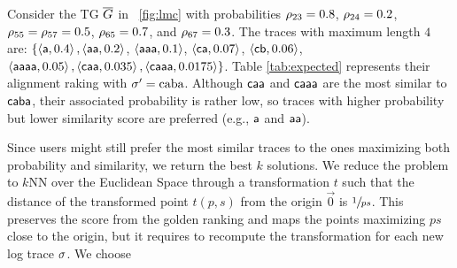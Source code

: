 \begin{table}[!t]
	\vspace{5mm}
	\centering
	\caption{Golden ranking of model traces with maximum length $4$, where $\logtrace=\const{caba}$ and $c=5$.}\label{tab:expected}
\end{table}
\begin{example}\label{ex:rankingTaus}
	Consider the TG $\overline{G}$ in \figurename~\ref{fig:lmc} with probabilities
	$\rho_{23}=0.8$, $\rho_{24}=0.2$, $\rho_{55}=\rho_{57}=0.5$, $\rho_{65}=0.7$, and $\rho_{67}=0.3$. The traces with maximum length $4$ are:
	$\{\braket{\mathsf{a},0.4},\braket{\mathsf{aa},0.2}$, $\braket{\mathsf{aaa},0.1}$, $\braket{\mathsf{ca},0.07}$,
	$\braket{\mathsf{cb},0.06}$,
	$\braket{\mathsf{aaaa},0.05},\braket{\mathsf{caa},0.035},\braket{\mathsf{caaa},0.0175}\}$.
	Table \ref{tab:expected} represents their alignment raking with  ${\sigma'}=\textup{caba}$.  Although $\mathsf{caa}$ and
	$\mathsf{caaa}$ are the most similar to $\mathsf{caba}$, their associated probability  is rather low, so traces with
	higher probability but lower similarity score are preferred (e.g., $\mathsf{a}$ and $\mathsf{aa}$).
\end{example}
%
{Since users might still prefer the most similar traces to the ones maximizing both probability and similarity, we
	return the best $k$ solutions.
	We reduce the problem to $k$NN over the Euclidean Space through a transformation $t$ such that the distance of the
	transformed point $t(p,s)$ from  the origin $\vec{0}$ is $\sfrac{1}{ps}$. This preserves the score from the golden ranking
	and maps the points maximizing $ps$ close to the origin, but it requires to recompute the transformation for each new log trace $\sigma$. We choose}
